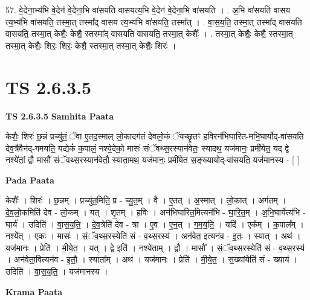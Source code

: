 \documentclass[17pt]{extarticle}
\begin{document}
57. वे॒देना॒भ्य॑भि वे॒देन॑ वे॒देना॒भि वा॑सयति वासयत्य॒भि वे॒देन॑ वे॒देना॒भि वा॑सयति । . अ॒भि वा॑सयति वासय त्य॒भ्य॑भि वा॑सयति॒ तस्मा॒त् तस्मा᳚द् वासय त्य॒भ्य॑भि वा॑सयति॒ तस्मा᳚त् । . वा॒स॒य॒ति॒ तस्मा॒त् तस्मा᳚द् वासयति वासयति॒ तस्मा॒त् केशैः॒ केशै॒ स्तस्मा᳚द् वासयति वासयति॒ तस्मा॒त् केशैः᳚ । . तस्मा॒त् केशैः॒ केशै॒ स्तस्मा॒त् तस्मा॒त् केशैः॒ शिरः॒ शिरः॒ केशै॒ स्तस्मा॒त् तस्मा॒त् केशैः॒ शिरः॑ । \newline
\pagebreak
{}
\section*{ TS 2.6.3.5 }

\textbf{TS 2.6.3.5 } \newline
\textbf{Samhita Paata} \newline

केशैः॒ शिरः॑ छ॒न्नं प्रच्यु॑तं॒ ॅवा ए॒तद॒स्माल् लो॒कादग॑तं देवलो॒कं ॅयच्छृ॒तꣳ ह॒विरन॑भिघारित-मभि॒घार्योद्-वा॑सयति देव॒त्रैवैन॑द्-गमयति॒ यद्येकं॑ क॒पालं॒ नश्ये॒देको॒ मासः॑ संॅवथ्स॒रस्यान॑वेतः॒ स्यादथ॒ यज॑मानः॒ प्रमी॑येत॒ यद् द्वे नश्ये॑तां॒ द्वौ मासौ॑ संॅवथ्स॒रस्यान॑वेतौ॒ स्याता॒मथ॒ यज॑मानः॒ प्रमी॑येत स॒ङ्ख्यायोद्-वा॑सयति॒ यज॑मानस्य - [  ] \newline

\textbf{Pada Paata} \newline

केशैः᳚ । शिरः॑ । छ॒न्नम् । प्रच्यु॑त॒मिति॒ प्र - च्यु॒त॒म् । वै । ए॒तत् । अ॒स्मात् । लो॒कात् । अग॑तम् । दे॒व॒लो॒कमिति॑ देव - लो॒कम् । यत् । शृ॒तम् । ह॒विः । अन॑भिघारित॒मित्यन॑भि - घा॒रि॒त॒म् । अ॒भि॒घार्येत्य॑भि - घार्य॑ । उदिति॑ । वा॒स॒य॒ति॒ । दे॒व॒त्रेति॑ देव - त्रा । ए॒व । ए॒न॒त् । ग॒म॒य॒ति॒ । यदि॑ । एक᳚म् । क॒पाल᳚म् । नश्ये᳚त् । एकः॑ । मासः॑ । सं॒ॅव॒थ्स॒रस्येति॑ सं - व॒थ्स॒रस्य॑ । अन॑वेत॒ इत्यन॑व - इ॒तः॒ । स्यात् । अथ॑ । यज॑मानः । प्रेति॑ । मी॒ये॒त॒ । यत् । द्वे इति॑ । नश्ये॑ताम् । द्वौ । मासौ᳚ । सं॒ॅव॒थ्स॒रस्येति॑ सं - व॒थ्स॒रस्य॑ । अन॑वेता॒वित्यन॑व - इ॒तौ॒ । स्याता᳚म् । अथ॑ । यज॑मानः । प्रेति॑ । मी॒ये॒त॒ । स॒ख्यांयेति॑ सं - ख्याय॑ । उदिति॑ । वा॒स॒य॒ति॒ । यज॑मानस्य ।  \newline


\textbf{Krama Paata} \newline
\end{document}
